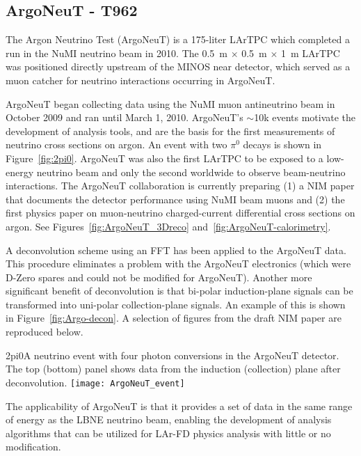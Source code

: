 \subsection{ArgoNeuT - T962}
The Argon Neutrino Test (ArgoNeuT) is a 175-liter LArTPC which completed a run in the NuMI neutrino beam in 2010.  The 0.5~m $\times$ 0.5~m $\times$ 1~m LArTPC was positioned directly upstream of the MINOS near detector, which served as a muon catcher for neutrino interactions occurring in ArgoNeuT. 

ArgoNeuT began collecting data using the NuMI muon antineutrino beam in October 2009 and ran until  March 1, 2010.  ArgoNeuT's $\sim$10k events motivate the development of analysis tools, and are the basis for the first measurements of neutrino cross sections on argon.   An event with two $\pi^{0}$ decays is shown in Figure~\ref{fig:2pi0}.   ArgoNeuT was also the first LArTPC to be exposed to a low-energy neutrino beam and only the second worldwide to observe beam-neutrino interactions. The ArgoNeuT collaboration is currently preparing (1) a NIM paper that documents the detector performance using NuMI beam muons and (2) the first physics paper on muon-neutrino charged-current differential cross sections on argon.  See Figures~\ref{fig:ArgoNeuT_3Dreco} and~\ref{fig:ArgoNeuT-calorimetry}.

A deconvolution scheme using an FFT has been applied to the ArgoNeuT data. This procedure eliminates a problem with the ArgoNeuT electronics (which were D-Zero spares and could not be modified for ArgoNeuT). Another more significant benefit of deconvolution is that bi-polar induction-plane signals can be transformed into uni-polar collection-plane signals. An example of this is shown in Figure~\ref{fig:Argo-decon}. A selection of figures from the draft NIM paper are reproduced below.


\begin{cdrfigure}{2pi0}{A neutrino event with four photon conversions in the ArgoNeuT detector. The top (bottom) panel shows data from the induction (collection) plane after deconvolution.}
\texttt{[image: ArgoNeuT\_event]}
\end{cdrfigure}


The applicability of ArgoNeuT is that it provides a set of data in the same range of energy as the LBNE neutrino beam, enabling the development of analysis algorithms that can be utilized for LAr-FD physics analysis with little or no modification.


